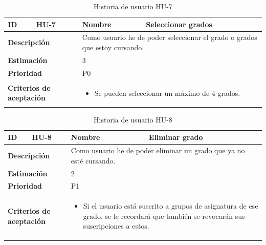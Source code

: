 \begin{table}[H]
    \centering
    \begin{tabular}{|p{2cm}|p{4cm}|p{2cm}|p{4cm}|}
        \hline
        \textbf{ID} & HU-7 & \textbf{Nombre} & Seleccionar grados \\
        \hline
        \multicolumn{2}{|p{6cm}|}{\textbf{Descripción}} & \multicolumn{2}{p{6cm}|}{Como usuario he de poder seleccionar el grado o grados que estoy cursando.} \\
        \hline
        \multicolumn{2}{|p{6cm}|}{\textbf{Estimación}} & \multicolumn{2}{p{6cm}|}{3} \\
        \hline
        \multicolumn{2}{|p{6cm}|}{\textbf{Prioridad}} & \multicolumn{2}{p{6cm}|}{P0} \\
        \hline
        \multicolumn{2}{|p{6cm}|}{\textbf{Criterios de aceptación}} & \multicolumn{2}{p{6cm}|}{
            \begin{itemize}
                \item Se pueden seleccionar un máximo de 4 grados.
            \end{itemize}
        } \\
        \hline
    \end{tabular}
    \caption{Historia de usuario HU-7}
    \label{tab:hu_7}
\end{table}

\begin{table}[H]
    \centering
    \begin{tabular}{|p{2cm}|p{4cm}|p{2cm}|p{4cm}|}
        \hline
        \textbf{ID} & HU-8 & \textbf{Nombre} & Eliminar grado \\
        \hline
        \multicolumn{2}{|p{6cm}|}{\textbf{Descripción}} & \multicolumn{2}{p{6cm}|}{Como usuario he de poder eliminar un grado que ya no esté cursando.} \\
        \hline
        \multicolumn{2}{|p{6cm}|}{\textbf{Estimación}} & \multicolumn{2}{p{6cm}|}{2} \\
        \hline
        \multicolumn{2}{|p{6cm}|}{\textbf{Prioridad}} & \multicolumn{2}{p{6cm}|}{P1} \\
        \hline
        \multicolumn{2}{|p{6cm}|}{\textbf{Criterios de aceptación}} & \multicolumn{2}{p{6cm}|}{
            \begin{itemize}
                \item Si el usuario está suscrito a grupos de asignatura de ese grado, se le recordará que también se revocarán sus suscripciones a estos.
            \end{itemize}
        } \\
        \hline
    \end{tabular}
    \caption{Historia de usuario HU-8}
    \label{tab:hu_8}
\end{table}

